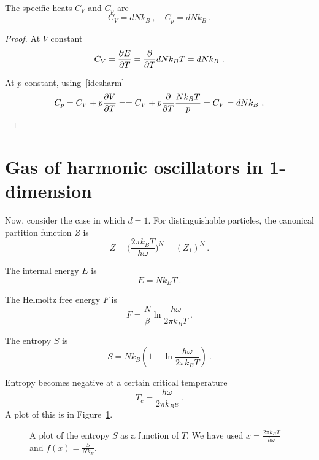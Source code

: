     The specific heats $C_V$ and $C_p$ are 
    \begin{equation*}
        C_V = d N k_B  ~, \quad C_p = d N k_B ~. 
    \end{equation*}
    \begin{proof}
        At $V$ constant
        \begin{equation*}
            C_V = \frac{\partial E}{\partial T} = \frac{\partial}{\partial T} d N k_B T  = d N k_B ~.
        \end{equation*}

        At $p$ constant, using~\eqref{idesharm}
        \begin{equation*}
            C_p = C_V + p \frac{\partial V}{\partial T} = = C_V + p \frac{\partial}{\partial T} \frac{N k_B T}{p} = C_V = d N k_B  ~.
        \end{equation*}
    \end{proof}

\section{Gas of harmonic oscillators in 1-dimension}

    Now, consider the case in which $d = 1$.
    For distinguishable particles, the canonical partition function $Z$ is 
    \begin{equation*}
        Z = \Big (\frac{2 \pi k_B T}{h \omega} \Big )^{N} = (Z_1)^N ~.
    \end{equation*}
    
    The internal energy $E$ is 
    \begin{equation*}
        E = N k_B T ~.
    \end{equation*}
   
    The Helmoltz free energy $F$ is 
    \begin{equation*}
        F = \frac{N}{\beta} \ln \frac{h \omega}{2 \pi k_B T} ~.
    \end{equation*}
    
    The entropy $S$ is 
    \begin{equation*}
        S = N k_B (1 - \ln \frac{h \omega}{2 \pi k_B T}) ~.
    \end{equation*}
 
    Entropy becomes negative at a certain critical temperature
    \begin{equation*}
        T_c = \frac{h \omega}{2 \pi k_B e} ~.
    \end{equation*}
    A plot of this is in Figure~\ref{can:ent2}.
    \begin{figure}
        \centering
        \caption{A plot of the entropy $S$ as a function of $T$. We have used $x = \frac{2 \pi k_B T}{h \omega}$ and $f(x) = \frac{S}{N k_B}$.}
        \label{can:ent2}
    \end{figure}

